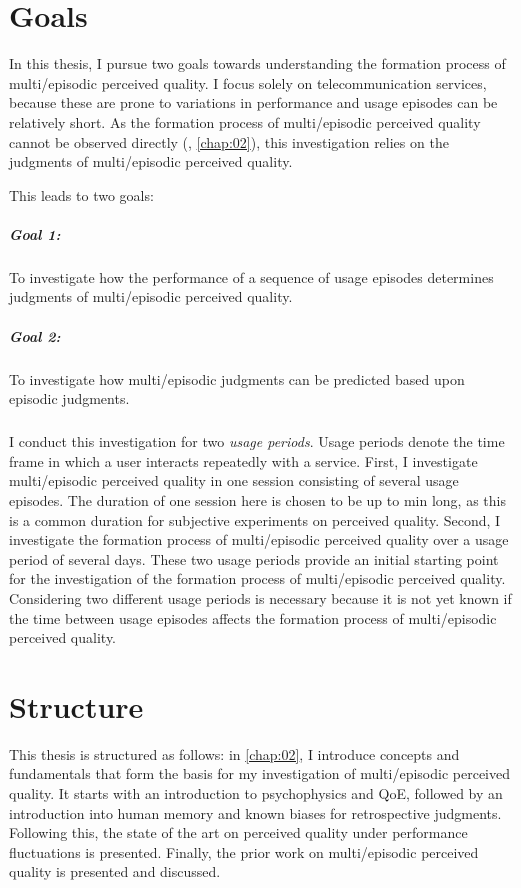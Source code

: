 \section{Goals}
In this thesis, I pursue two goals towards understanding the formation process of multi\-/episodic perceived quality.
I focus solely on telecommunication services, because these are prone to variations in performance and usage episodes can be relatively short.
As the formation process of multi\-/episodic perceived quality cannot be observed directly (\cf, \autoref{chap:02}), this investigation relies on the judgments of multi\-/episodic perceived quality.

This leads to two goals:

\subparagraph*{Goal 1:}
To investigate how the performance of a sequence of usage episodes determines judgments of multi\-/episodic perceived quality.

\subparagraph*{Goal 2:}
To investigate how multi\-/episodic judgments can be predicted based upon episodic judgments.

\subparagraph*{}
I conduct this investigation for two \emph{usage periods}.
Usage periods denote the time frame in which a user interacts repeatedly with a service.
First, I investigate multi\-/episodic perceived quality in one session consisting of several usage episodes.
The duration of one session here is chosen to be up to \unit[45]{min} long, as this is a common duration for subjective experiments on perceived quality.
Second, I investigate the formation process of multi\-/episodic perceived quality over a usage period of several days.
These two usage periods provide an initial starting point for the investigation of the formation process of multi\-/episodic perceived quality.
Considering two different usage periods is necessary because it is not yet known if the time between usage episodes affects the formation process of multi\-/episodic perceived quality.

\section{Structure}
This thesis is structured as follows:
in \autoref{chap:02}, I introduce concepts and fundamentals that form the basis for my investigation of multi\-/episodic perceived quality.
It starts with an introduction to psychophysics and \ac{QoE}, followed by an introduction into human memory and known biases for retrospective judgments.
Following this, the state of the art on perceived quality under performance fluctuations is presented.
Finally, the prior work on multi\-/episodic perceived quality is presented and discussed.

